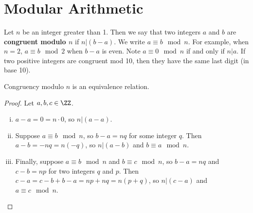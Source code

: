 \documentclass[../abstract_algebra.tex]{subfiles}
\begin{document}
    \section{Modular Arithmetic}
        \paragraph{}
        Let $n$ be an integer greater than 1.
        Then we say that two integers $a$ and $b$ are \textbf{congruent modulo $n$} if $n|(b-a)$.
        We write $a\equiv b\mod n$.
        For example, when $n=2$, $a\equiv b\mod 2$ when $b-a$ is even.
        Note $a\equiv 0\mod n$ if and only if $n|a$.
        If two positive integers are congruent mod 10, then they have the same last digit (in base 10).
        \begin{theorem}
            Congruency modulo $n$ is an equivalence relation.
        \end{theorem}
        \begin{proof}
            Let $a,b,c\in\ZZ$.
            \begin{enumerate}[(i)]
                \item $a-a=0=n\cdot 0$, so $n|(a-a)$.
                \item Suppose $a\equiv b\mod n$, so $b-a=nq$ for some integer $q$. Then $a-b=-nq=n(-q)$, so $n|(a-b)$ and $b\equiv a\mod n$.
                \item Finally, suppose $a\equiv b\mod n$ and $b\equiv c\mod n$, so $b-a=nq$ and $c-b=np$ for two integers $q$ and $p$. Then $c-a=c-b+b-a=np+nq=n(p+q)$, so $n|(c-a)$ and $a\equiv c\mod n$.
            \end{enumerate}
        \end{proof}
\end{document}
